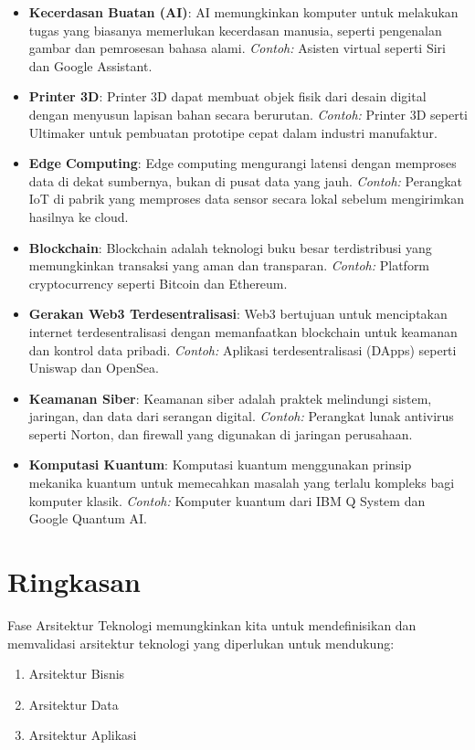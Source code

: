 \begin{itemize}
	\item \textbf{Kecerdasan Buatan (AI)}: AI memungkinkan komputer untuk melakukan tugas yang biasanya memerlukan kecerdasan manusia, seperti pengenalan gambar dan pemrosesan bahasa alami. \emph{Contoh:} Asisten virtual seperti Siri dan Google Assistant.
	
	\item \textbf{Printer 3D}: Printer 3D dapat membuat objek fisik dari desain digital dengan menyusun lapisan bahan secara berurutan. \emph{Contoh:} Printer 3D seperti Ultimaker untuk pembuatan prototipe cepat dalam industri manufaktur.
	
	\item \textbf{Edge Computing}: Edge computing mengurangi latensi dengan memproses data di dekat sumbernya, bukan di pusat data yang jauh. \emph{Contoh:} Perangkat IoT di pabrik yang memproses data sensor secara lokal sebelum mengirimkan hasilnya ke cloud.
	
	\item \textbf{Blockchain}: Blockchain adalah teknologi buku besar terdistribusi yang memungkinkan transaksi yang aman dan transparan. \emph{Contoh:} Platform cryptocurrency seperti Bitcoin dan Ethereum.
	
	\item \textbf{Gerakan Web3 Terdesentralisasi}: Web3 bertujuan untuk menciptakan internet terdesentralisasi dengan memanfaatkan blockchain untuk keamanan dan kontrol data pribadi. \emph{Contoh:} Aplikasi terdesentralisasi (DApps) seperti Uniswap dan OpenSea.
	
	\item \textbf{Keamanan Siber}: Keamanan siber adalah praktek melindungi sistem, jaringan, dan data dari serangan digital. \emph{Contoh:} Perangkat lunak antivirus seperti Norton, dan firewall yang digunakan di jaringan perusahaan.
	
	\item \textbf{Komputasi Kuantum}: Komputasi kuantum menggunakan prinsip mekanika kuantum untuk memecahkan masalah yang terlalu kompleks bagi komputer klasik. \emph{Contoh:} Komputer kuantum dari IBM Q System dan Google Quantum AI.
\end{itemize}

\section{Ringkasan}
Fase Arsitektur Teknologi memungkinkan kita untuk mendefinisikan dan memvalidasi arsitektur teknologi yang diperlukan untuk mendukung:
\begin{enumerate}
	\item Arsitektur Bisnis
	\item Arsitektur Data
	\item Arsitektur Aplikasi
\end{enumerate}

